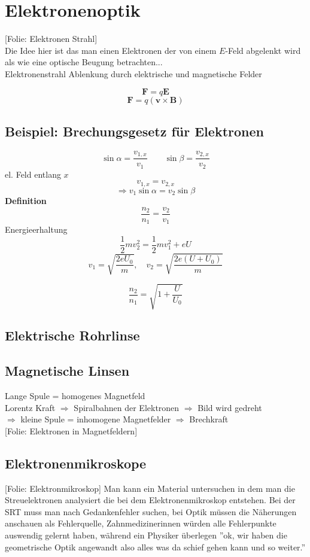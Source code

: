 \documentclass[titlepage,11pt,a4paper,ngerman]{report}
\newcommand{\folie}[1]{\color{gray}[Folie: #1]\color{black}}
\renewcommand{\vec}[1]{\boldsymbol{#1}}
\newcommand{\lcom}[1]{\color{MidnightBlue}#1\color{black}}
\newcommand{\frbox}[2]{\begin{tcolorbox}[colback=white,colframe=red!75!black,fonttitle=\bfseries,title=#1]#2\end{tcolorbox}}
\begin{document}

\section{Elektronenoptik}

\folie{Elektronen Strahl}\\
\lcom{Die Idee hier ist das man einen Elektronen der von einem $E$-Feld abgelenkt wird als wie eine optische Beugung betrachten...}\\
Elektronenstrahl Ablenkung durch elektrische und magnetische Felder

$$\vec{F} = q \vec{E}$$
$$\vec{F} = q (\vec{v} \times \vec{B})$$
\subsection{Beispiel: Brechungsgesetz für Elektronen}

$$\sin \alpha = \frac{v_{1,x}}{v_1} \qquad \sin \beta = \frac{v_{2,x}}{v_2}$$
el. Feld entlang $x$
$$v_{1,x} = v_{2,x}$$
$$\Rightarrow v_1 \sin \alpha = v_2 \sin \beta$$
\textbf{Definition}
$$\frac{n_2}{n_1} = \frac{v_2}{v_1}$$
Energieerhaltung
$$\frac{1}{2} mv^2_2 = \frac{1}{2} mv_1^2 + eU$$
$$v_1 = \sqrt{\frac{2eU_0}{m}}, \quad v_2 = \sqrt{\frac{2e(U+U_0)}{m}}$$
\frbox{$\Rightarrow$ Brechindex}{$$\frac{n_2}{n_1} = \sqrt{1 + \frac{U}{U_0}}$$}

\subsection{Elektrische Rohrlinse}
\subsection{Magnetische Linsen}

Lange Spule = homogenes Magnetfeld\\
Lorentz Kraft $\Rightarrow$ Spiralbahnen der Elektronen $\Rightarrow$ Bild wird gedreht\\
$\Rightarrow$ kleine Spule = inhomogene Magnetfelder $\Rightarrow$ Brechkraft \\
\folie{Elektronen in Magnetfeldern}
\subsection{Elektronenmikroskope}
\folie{Elektronmikroskop}
\lcom{Man kann ein Material untersuchen in dem man die Streuelektronen analysiert die bei dem Elektronenmikroskop entstehen.}
\lcom{Bei der SRT muss man nach Gedankenfehler suchen, bei Optik müssen die Näherungen anschauen als Fehlerquelle, Zahnmedizinerinnen würden alle Fehlerpunkte auswendig gelernt haben, während ein Physiker überlegen ''ok, wir haben die geometrische Optik angewandt also alles was da schief gehen kann und so weiter.''}
\end{document}
